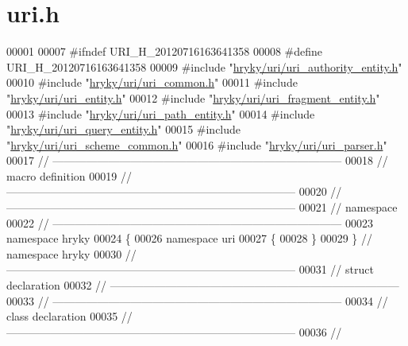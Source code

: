 \hypertarget{uri_8h_source}{\section{uri.\-h}
}

\begin{DoxyCode}
00001 
00007 \textcolor{preprocessor}{#ifndef URI\_H\_20120716163641358}
00008 \textcolor{preprocessor}{}\textcolor{preprocessor}{#define URI\_H\_20120716163641358}
00009 \textcolor{preprocessor}{}\textcolor{preprocessor}{#include "\hyperlink{uri__authority__entity_8h}{hryky/uri/uri_authority_entity.h}"}
00010 \textcolor{preprocessor}{#include "\hyperlink{uri__common_8h}{hryky/uri/uri_common.h}"}
00011 \textcolor{preprocessor}{#include "\hyperlink{uri__entity_8h}{hryky/uri/uri_entity.h}"}
00012 \textcolor{preprocessor}{#include "\hyperlink{uri__fragment__entity_8h}{hryky/uri/uri_fragment_entity.h}"}
00013 \textcolor{preprocessor}{#include "\hyperlink{uri__path__entity_8h}{hryky/uri/uri_path_entity.h}"}
00014 \textcolor{preprocessor}{#include "\hyperlink{uri__query__entity_8h}{hryky/uri/uri_query_entity.h}"}
00015 \textcolor{preprocessor}{#include "\hyperlink{uri__scheme__common_8h}{hryky/uri/uri_scheme_common.h}"}
00016 \textcolor{preprocessor}{#include "\hyperlink{uri__parser_8h}{hryky/uri/uri_parser.h}"}
00017 \textcolor{comment}{//
      ------------------------------------------------------------------------------}
00018 \textcolor{comment}{// macro definition}
00019 \textcolor{comment}{//
      ------------------------------------------------------------------------------}
00020 \textcolor{comment}{//
      ------------------------------------------------------------------------------}
00021 \textcolor{comment}{// namespace}
00022 \textcolor{comment}{//
      ------------------------------------------------------------------------------}
00023 \textcolor{keyword}{namespace }hryky
00024 \{
00026 \textcolor{keyword}{namespace }uri
00027 \{
00028 \}
00029 \} \textcolor{comment}{// namespace hryky}
00030 \textcolor{comment}{//
      ------------------------------------------------------------------------------}
00031 \textcolor{comment}{// struct declaration}
00032 \textcolor{comment}{//
      ------------------------------------------------------------------------------}
00033 \textcolor{comment}{//
      ------------------------------------------------------------------------------}
00034 \textcolor{comment}{// class declaration}
00035 \textcolor{comment}{//
      ------------------------------------------------------------------------------}
00036 \textcolor{comment}{//
}
\end{DoxyCode}

